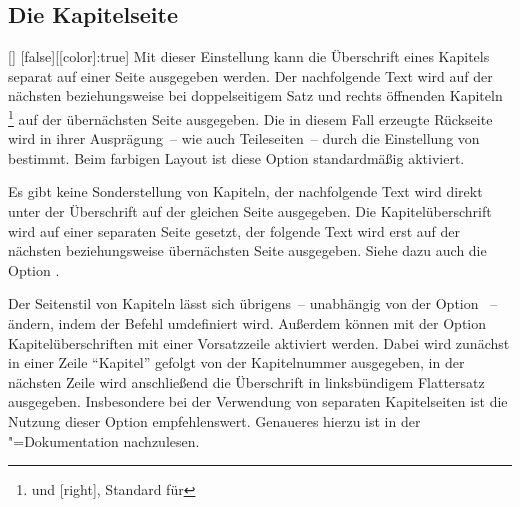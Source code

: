 \subsection{Die Kapitelseite}
\begin{Declaration}{[\PBoolean]}%
  [false][[color]:true]%
\printdeclarationlist%
\label{sec:chapter}%
%
%
%
Mit dieser Einstellung kann die Überschrift eines Kapitels separat auf einer 
Seite ausgegeben werden. Der nachfolgende Text wird auf der nächsten 
beziehungsweise bei doppelseitigem Satz und rechts öffnenden Kapiteln%
\footnote{%
   und [right], Standard für 
}
auf der übernächsten Seite ausgegeben. Die in diesem Fall erzeugte Rückseite 
wird in ihrer Ausprägung~-- wie auch Teileseiten~-- durch die Einstellung von 
 bestimmt. Beim farbigen Layout ist diese Option 
standardmäßig aktiviert. \notudscrartcl
%
\begin{values}
\itemfalse
  Es gibt keine Sonderstellung von Kapiteln, der nachfolgende Text wird direkt 
  unter der Überschrift auf der gleichen Seite ausgegeben.
\itemtrue*
  Die Kapitelüberschrift wird auf einer separaten Seite gesetzt, der folgende
  Text wird erst auf der nächsten beziehungsweise übernächsten Seite 
  ausgegeben. Siehe dazu auch die Option .
\end{values}
%
Der Seitenstil von Kapiteln lässt sich übrigens~-- unabhängig von der Option 
~-- ändern, indem der Befehl  
umdefiniert wird. Außerdem können mit der Option  
Kapitelüberschriften mit einer Vorsatzzeile aktiviert werden. Dabei wird 
zunächst in einer Zeile \enquote{Kapitel} gefolgt von der Kapitelnummer 
ausgegeben, in der nächsten Zeile wird anschließend die Überschrift in 
linksbündigem Flattersatz ausgegeben. Insbesondere bei der Verwendung von 
separaten Kapitelseiten ist die Nutzung dieser Option empfehlenswert. Genaueres 
hierzu ist in der \KOMAScript"=Dokumentation nachzulesen.
\end{Declaration}


